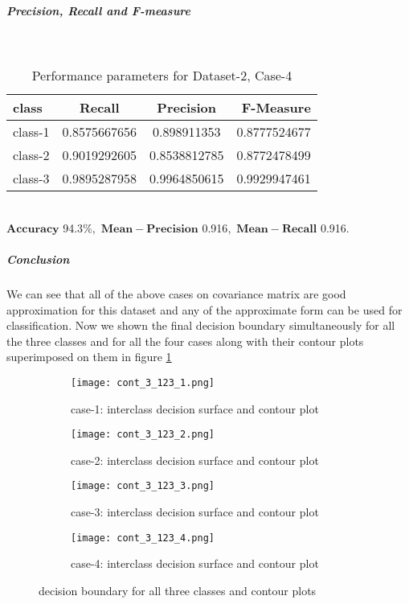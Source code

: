 \documentclass[a4paper]{article}
\begin{document}
\subparagraph{Precision, Recall and F-measure} \textcolor{white}{:}
\begin{table}[h!]
  \begin{center}
    \caption{Performance parameters for Dataset-2, Case-4}
    \label{tab:table1}
    \begin{tabular}{l|c|c|r} %
      \textbf{class} & \textbf{Recall} & \textbf{Precision} & \textbf{F-Measure}\\
      \hline
      class-1 & 0.8575667656 & 0.898911353 & 0.8777524677\\
      class-2 & 0.9019292605 & 0.8538812785 & 0.8772478499\\
      class-3 & 0.9895287958 & 0.9964850615 & 0.9929947461\\
    \end{tabular}
  \end{center}
\end{table}
\\$\mathbf{Accuracy}$ 94.3$\%,$ $\mathbf{Mean- Precision}$ 0.916$,$ $\mathbf{Mean- Recall}$ 0.916$.$
\newpage
\subparagraph{Conclusion}
We can see that all of the above cases on covariance matrix are good approximation for this dataset and any of the approximate form can be used for classification. Now we shown the final decision boundary simultaneously for all the three classes and for all the four cases along with their contour plots superimposed on them in figure \ref{fig:cont_3_4}
\begin{figure}[h!]
  \centering
  \begin{subfigure}[b]{0.4\linewidth}
    \texttt{[image: cont\_3\_123\_1.png]}
     \caption{case-1: interclass decision surface and contour plot}
  \end{subfigure}
  \begin{subfigure}[b]{0.4\linewidth}
    \texttt{[image: cont\_3\_123\_2.png]}
    \caption{case-2: interclass decision surface and contour plot}
  \end{subfigure}
  \begin{subfigure}[b]{0.4\linewidth}
    \texttt{[image: cont\_3\_123\_3.png]}
    \caption{case-3: interclass decision surface and contour plot}
  \end{subfigure}
  \begin{subfigure}[b]{0.4\linewidth}
    \texttt{[image: cont\_3\_123\_4.png]}
    \caption{case-4: interclass decision surface and contour plot}
  \end{subfigure}
  \caption{decision boundary for all three classes and contour plots}
  \label{fig:cont_3_4}
\end{figure}
\newpage
\end{document}
